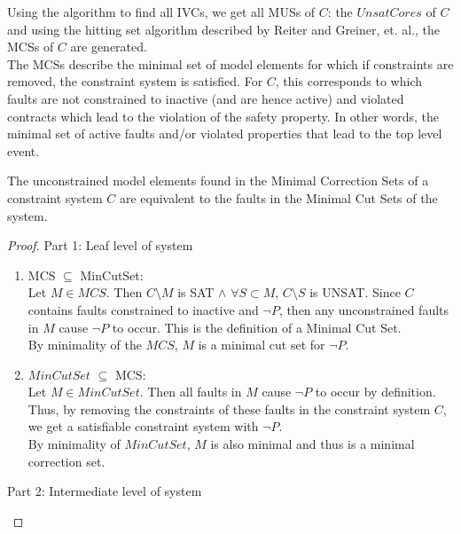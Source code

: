 Using the algorithm to find all IVCs, we get all MUSs of $C$: the $UnsatCores$ of $C$ and using the hitting set algorithm described by Reiter and Greiner, et. al., the MCSs of $C$ are generated.\\

The MCSs describe the minimal set of model elements for which if constraints are removed, the constraint system is satisfied. For $C$, this corresponds to which faults are not constrained to inactive (and are hence active) and violated contracts which lead to the violation of the safety property. In other words, the minimal set of active faults and/or violated properties that lead to the top level event. 

\begin{theorem} The unconstrained model elements found in the Minimal Correction Sets of a constraint system $C$ are equivalent to the faults in the Minimal Cut Sets of the system.

\begin{proof} 

Part 1: Leaf level of system
\begin{enumerate}[label=(\roman*)]

\item MCS $\subseteq$ MinCutSet: \\

Let $M \in  MCS$. Then $C\setminus M$ is SAT $\land$ $ \forall S \subset M$, $C \setminus S$ is UNSAT. Since $C$ contains faults constrained to inactive and $ \neg P $, then any unconstrained faults in $M$ cause $ \neg P $ to occur. This is the definition of a Minimal Cut Set.  \\

By minimality of the $MCS$, $M$ is a minimal cut set for $ \neg P $.  \\

\item $MinCutSet $ $\subseteq$ MCS: \\

Let $M \in MinCutSet$. Then all faults in $M$ cause $ \neg P $ to occur by definition. Thus, by removing the constraints of these faults in the constraint system $C$, we get a satisfiable constraint system with $ \neg P $.  \\

By minimality of $MinCutSet$, $M$ is also minimal and thus is a minimal correction set.

\end{enumerate}

Part 2: Intermediate level of system
\begin{enumerate}[label=(\roman*)]


\end{enumerate}
\end{proof}
\end{theorem}
